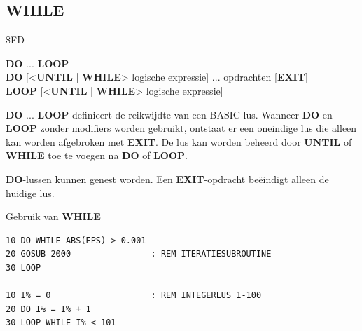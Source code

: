 \newpage
\subsection{WHILE}
\begin{description}[leftmargin=2cm,style=nextline]
\item [Token:]    \$FD

\item [Formaat:]   {\bf DO} ... {\bf LOOP} \\                {\bf DO} [<{\bf UNTIL} | {\bf WHILE}> logische expressie] ... opdrachten [{\bf EXIT}] \\                  {\bf LOOP} [<{\bf UNTIL} | {\bf WHILE}> logische expressie]

\item [Gebruik:]    {\bf DO} ... {\bf LOOP} definieert de reikwijdte van een BASIC-lus. Wanneer {\bf DO} en {\bf LOOP} zonder modifiers worden gebruikt, ontstaat er een oneindige lus die alleen kan worden afgebroken met {\bf EXIT}. De lus kan worden beheerd door {\bf UNTIL} of {\bf WHILE} toe te voegen na {\bf DO} of {\bf LOOP}.

\item [Opmerkingen:]  {\bf DO}-lussen kunnen genest worden. Een {\bf EXIT}-opdracht beëindigt alleen de huidige lus.

\item [Voorbeelden:] Gebruik van {\bf WHILE}

\begin{tcolorbox}[colback=black,coltext=white]
\verbatimfont{\codefont}
\begin{verbatim}
10 DO WHILE ABS(EPS) > 0.001
20 GOSUB 2000                : REM ITERATIESUBROUTINE
30 LOOP

10 I% = 0                    : REM INTEGERLUS 1-100
20 DO I% = I% + 1
30 LOOP WHILE I% < 101
\end{verbatim}
\end{tcolorbox}
\end{description}


\newpage
